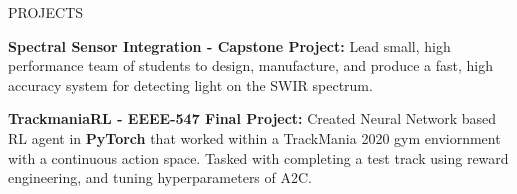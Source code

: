 \documentclass{resume} %
\begin{document}

\begin{rSection}{PROJECTS}
\vspace{-0.75em}
\item \textbf{Spectral Sensor Integration - Capstone Project:} {Lead small, high performance team of students to design, manufacture, and produce a fast, high accuracy system for detecting light on the SWIR spectrum.}
\item \textbf{TrackmaniaRL - EEEE-547 Final Project:} {Created Neural Network based RL agent in \textbf{PyTorch} that worked within a TrackMania 2020 gym enviornment with a continuous action space.
Tasked with completing a test track using reward engineering, and tuning hyperparameters of A2C.}
\end{rSection} 
\end{document}
